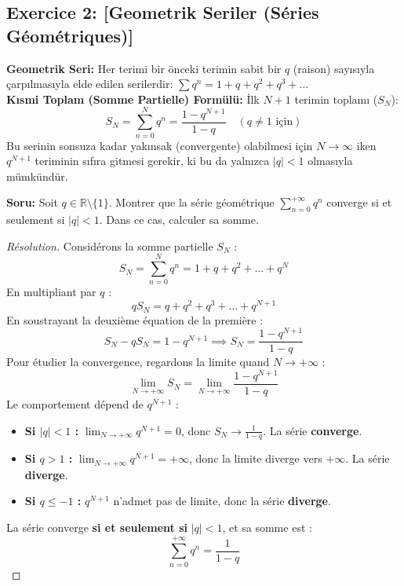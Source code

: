 \documentclass[12pt,a4paper]{report}
\begin{document}
\subsection*{Exercice 2: [Geometrik Seriler (Séries Géométriques)]}

\begin{tcolorbox}[colback=teal!5!white,colframe=teal!75!black,title=Hatırlatma (Rappel): Geometrik Seri ve Kısmi Toplam]
\textbf{Geometrik Seri:} Her terimi bir önceki terimin sabit bir $q$ (raison) sayısıyla çarpılmasıyla elde edilen serilerdir: $\sum q^n = 1 + q + q^2 + q^3 + \dots$ \\
\textbf{Kısmi Toplam (Somme Partielle) Formülü:} İlk $N+1$ terimin toplamı ($S_N$):
\[ S_N = \sum_{n=0}^N q^n = \frac{1 - q^{N+1}}{1 - q} \quad (q \neq 1 \text{ için}) \]
Bu serinin sonsuza kadar yakınsak (convergente) olabilmesi için $N \to \infty$ iken $q^{N+1}$ teriminin sıfıra gitmesi gerekir, ki bu da yalnızca $|q| < 1$ olmasıyla mümkündür.
\end{tcolorbox}

\textbf{Soru:}
Soit $q \in \mathbb{R} \setminus \{1\}$. Montrer que la série géométrique $\sum_{n=0}^{+\infty} q^n$ converge si et seulement si $|q| < 1$. Dans ce cas, calculer sa somme.

\begin{proof}[Résolution]
Considérons la somme partielle $S_N$ :
\[ S_N = \sum_{n=0}^N q^n = 1 + q + q^2 + \dots + q^N \]
En multipliant par $q$ :
\[ q S_N = q + q^2 + q^3 + \dots + q^{N+1} \]
En soustrayant la deuxième équation de la première :
\[ S_N - q S_N = 1 - q^{N+1} \implies S_N = \frac{1 - q^{N+1}}{1 - q} \]
Pour étudier la convergence, regardons la limite quand $N \to +\infty$ :
\[ \lim_{N \to +\infty} S_N = \lim_{N \to +\infty} \frac{1 - q^{N+1}}{1 - q} \]
Le comportement dépend de $q^{N+1}$ :
\begin{itemize}
    \item \textbf{Si $|q| < 1$ :} $\lim_{N \to +\infty} q^{N+1} = 0$, donc $S_N \to \frac{1}{1 - q}$. La série \textbf{converge}.
    \item \textbf{Si $q > 1$ :} $\lim_{N \to +\infty} q^{N+1} = +\infty$, donc la limite diverge vers $+\infty$. La série \textbf{diverge}.
    \item \textbf{Si $q \le -1$ :} $q^{N+1}$ n'admet pas de limite, donc la série \textbf{diverge}.
\end{itemize}
La série converge \textbf{si et seulement si} $|q| < 1$, et sa somme est :
\[ \sum_{n=0}^{+\infty} q^n = \frac{1}{1-q} \]
\end{proof}
\end{document}
